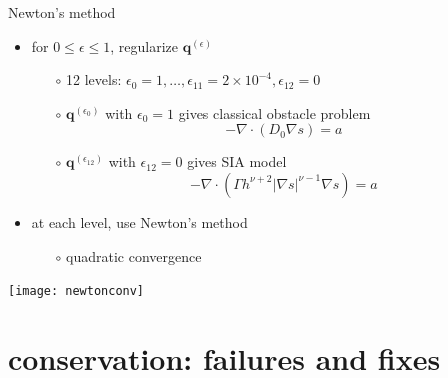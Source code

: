 \documentclass[xcolor={dvipsnames}]{beamer}
\newcommand\bq{\mathbf{q}}
\newcommand\Div{\nabla\cdot}
\newcommand\eps{\epsilon}
\newcommand\grad{\nabla}
\begin{document}
\begin{frame}{Newton's method}

\begin{itemize}
\item for $0 \le \eps \le 1$, regularize $\bq^{(\eps)}$
  \begin{itemize}
  \item[$\circ$] 12 levels: $\eps_0=1, \dots, \eps_{11}=2\times 10^{-4}, \eps_{12}=0$
  \item[$\circ$] $\bq^{(\eps_0)}$ with $\eps_0=1$ gives classical obstacle problem
    $$- \Div (D_0 \grad s) = a$$
  \item[$\circ$] $\bq^{(\eps_{12})}$ with $\eps_{12}=0$ gives SIA model
    $$- \Div (\Gamma h^{\nu+2} |\grad s|^{\nu-1} \grad s) = a$$
  \end{itemize}
\item at each level, use Newton's method
  \begin{itemize}
  \item[$\circ$] quadratic convergence
  \end{itemize}
\end{itemize}

\begin{center}
\texttt{[image: newtonconv]}
\end{center}
\end{frame}


\section{conservation: failures and fixes}
\end{document}
